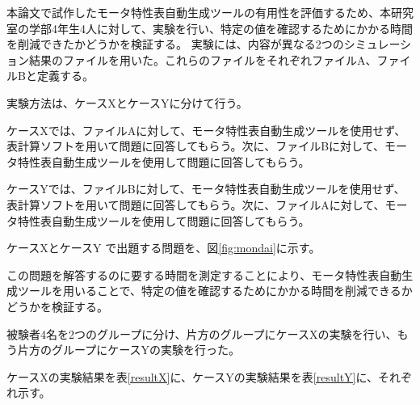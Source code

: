 本論文で試作したモータ特性表自動生成ツールの有用性を評価するため、本研究室の学部4年生4人に対して、実験を行い、特定の値を確認するためにかかる時間を削減できたかどうかを検証する。
実験には、内容が異なる2つのシミュレーション結果のファイルを用いた。これらのファイルをそれぞれファイルA、ファイルBと定義する。

実験方法は、ケースXとケースYに分けて行う。

ケースXでは、ファイルAに対して、モータ特性表自動生成ツールを使用せず、表計算ソフトを用いて問題に回答してもらう。次に、ファイルBに対して、モータ特性表自動生成ツールを使用して問題に回答してもらう。

ケースYでは、ファイルBに対して、モータ特性表自動生成ツールを使用せず、表計算ソフトを用いて問題に回答してもらう。次に、ファイルAに対して、モータ特性表自動生成ツールを使用して問題に回答してもらう。

ケースXとケースY で出題する問題を、図\ref{fig:mondai}に示す。

この問題を解答するのに要する時間を測定することにより、モータ特性表自動生成ツールを用いることで、特定の値を確認するためにかかる時間を削減できるかどうかを検証する。

被験者4名を2つのグループに分け、片方のグループにケースXの実験を行い、もう片方のグループにケースYの実験を行った。

ケースXの実験結果を表\ref{resultX}に、ケースYの実験結果を表\ref{resultY}に、それぞれ示す。


